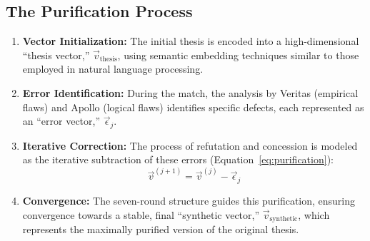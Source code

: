 \documentclass[11pt,a4paper]{article}
\begin{document}
\subsection{The Purification Process}

\begin{enumerate}[leftmargin=*]
    \item \textbf{Vector Initialization:} The initial thesis is encoded into a high-dimensional ``thesis vector,'' $\vec{v}_{\text{thesis}}$, using semantic embedding techniques similar to those employed in natural language processing.
    
    \item \textbf{Error Identification:} During the match, the analysis by Veritas (empirical flaws) and Apollo (logical flaws) identifies specific defects, each represented as an ``error vector,'' $\vec{\epsilon}_j$.
    
    \item \textbf{Iterative Correction:} The process of refutation and concession is modeled as the iterative subtraction of these errors (Equation~\ref{eq:purification}):
    \[
    \vec{v}^{(j+1)} = \vec{v}^{(j)} - \vec{\epsilon}_j
    \]
    
    \item \textbf{Convergence:} The seven-round structure guides this purification, ensuring convergence towards a stable, final ``synthetic vector,'' $\vec{v}_{\text{synthetic}}$, which represents the maximally purified version of the original thesis.
\end{enumerate}
\end{document}
